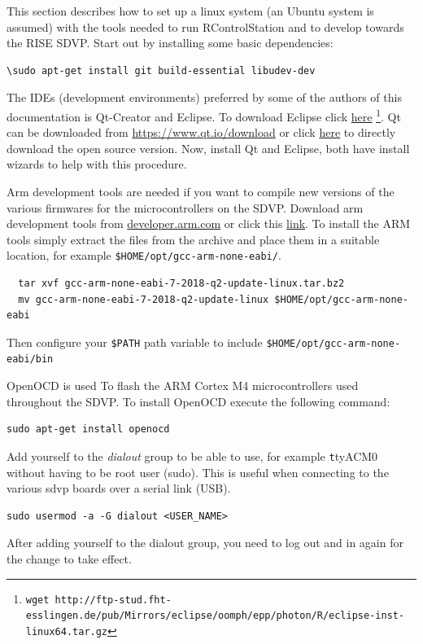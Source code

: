 \documentclass[12pt]{article} %
\begin{document}
This section describes how to set up a linux system (an Ubuntu system
is assumed) with the tools needed to run RControlStation and to
develop towards the RISE SDVP. Start out by installing some basic
dependencies:

\begin{Verbatim}
\sudo apt-get install git build-essential libudev-dev
\end{Verbatim}

The IDEs (development environments) preferred by some of the authors of
this documentation is Qt-Creator and Eclipse. To download Eclipse
click
\href{http://ftp-stud.fht-esslingen.de/pub/Mirrors/eclipse/oomph/epp/photon/R/eclipse-inst-linux64.tar.gz}{here}
\footnote{\texttt{\tiny{wget
      http://ftp-stud.fht-esslingen.de/pub/Mirrors/eclipse/oomph/epp/photon/R/eclipse-inst-linux64.tar.gz}}}.
Qt can be downloaded from \url{https://www.qt.io/download} or click
\href{http://download.qt.io/official_releases/online_installers/qt-unified-linux-x64-online.run}{here}
to directly download the open source version. Now, install Qt and
Eclipse, both have install wizards to help with this procedure. 

Arm development tools are needed if you want to compile new versions
of the various firmwares for the microcontrollers on the
SDVP. Download arm development tools from \url{developer.arm.com} or
click this
\href{https://developer.arm.com/-/media/Files/downloads/gnu-rm/7-2018q2/gcc-arm-none-eabi-7-2018-q2-update-linux.tar.bz2?revision=bc2c96c0-14b5-4bb4-9f18-bceb4050fee7?product=GNU%20Arm%20Embedded%20Toolchain,64-bit,,Linux,7-2018-q2-update}{link}. 
  To install the ARM tools simply extract the files from the archive
  and place them in a suitable location, for example \texttt{\$HOME/opt/gcc-arm-none-eabi/}.
\begin{Verbatim}
  tar xvf gcc-arm-none-eabi-7-2018-q2-update-linux.tar.bz2
  mv gcc-arm-none-eabi-7-2018-q2-update-linux $HOME/opt/gcc-arm-none-eabi
\end{Verbatim} 
Then configure your \texttt{\$PATH} path variable to include \texttt{\$HOME/opt/gcc-arm-none-eabi/bin}

OpenOCD is used To flash the ARM Cortex M4 microcontrollers used throughout the SDVP.
To install OpenOCD execute the following command: 
\begin{Verbatim}
sudo apt-get install openocd
\end{Verbatim} 

Add yourself to the {\em dialout} group to be able to use, for example
{\texttt ttyACM0} without having to be root user (sudo). This is useful when connecting to
the various sdvp boards over a serial link (USB). 
\begin{Verbatim}
sudo usermod -a -G dialout <USER_NAME> 
\end{Verbatim}
After adding yourself to the dialout group, you need to log out and in again
for the change to take effect. 
\end{document}
